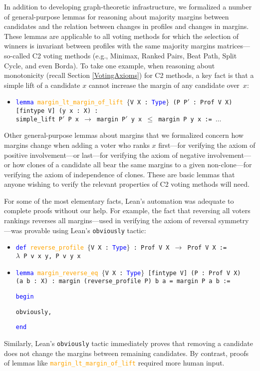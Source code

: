\documentclass[runningheads]{llncs}
\begin{document}
In addition to developing graph-theoretic infrastructure, we formalized a number of general-purpose lemmas for reasoning about majority margins between candidates and the relation between changes in profiles and changes in margins. These lemmas are applicable to all voting methods for which the selection of winners is invariant between profiles with the same majority margins matrices---so-called C2 voting methods \cite{Fishburn1977} (e.g., Minimax, Ranked Pairs, Beat Path, Split Cycle, and even Borda). To take one example, when reasoning about monotonicity (recall Section \ref{VotingAxioms}) for C2 methods, a key fact is that a simple lift of a candidate $x$ cannot  increase the margin of any candidate over~$x$:
\begin{itemize}
\item[] \texttt{\textcolor{blue}{lemma} \textcolor{orange}{margin\_lt\_margin\_of\_lift}  $\{$V X : \textcolor{blue}{Type}$\}$ (P P$'$ : Prof V X)} \\  \texttt{[fintype V] (y x : X) :} \\
\texttt{simple\_lift P$'$ P x $\to$ margin P$'$ y x $\leq$ margin P y x := $\dots$}
\end{itemize}
Other general-purpose lemmas about margins that we formalized concern how margins change when adding a voter who ranks $x$ first---for verifying the axiom of positive involvement---or last---for verifying the axiom of negative involvement---or how clones of a candidate all bear the same margins to a given non-clone---for verifying the axiom of independence of clones. These are basic lemmas that anyone wishing to verify the relevant properties of C2 voting methods will need. 

For some of the most elementary facts, Lean's automation was adequate to complete proofs without our help. For example, the fact that reversing all voters rankings reverses all margins---used in verifying the axiom of reversal symmetry---was provable using Lean's \texttt{obviously} tactic:

\begin{itemize}
\item[] \texttt{\textcolor{blue}{def} \textcolor{orange}{reverse\_profile} $\{$V X : \textcolor{blue}{Type}$\}$ : Prof V X $\to$ Prof V X := \\ $\lambda$ P v x y, P v y x} \\
\item[]  \texttt{\textcolor{blue}{lemma} \textcolor{orange}{margin\_reverse\_eq}  $\{$V X : \textcolor{blue}{Type}$\}$ [fintype V] (P : Prof V X)  \\}
\texttt{(a b : X) : margin (reverse\_profile P) b a = margin P a b :=}

\texttt{\textcolor{blue}{begin}}

  \quad \texttt{obviously,}
  
\texttt{\textcolor{blue}{end}}
\end{itemize}
Similarly, Lean's \texttt{obviously} tactic immediately proves that removing a candidate does not change the margins between remaining candidates. By contrast, proofs of lemmas like \texttt{\textcolor{orange}{margin\_lt\_margin\_of\_lift}} required more human input.
\end{document}
